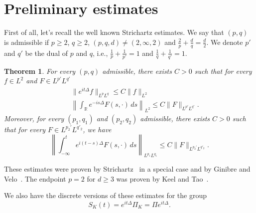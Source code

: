 \documentclass[10pt,a4paper]{article}
\newtheorem{theorem}{Theorem}[section]
\begin{document}
  \section{Preliminary estimates}\label{sec:pre-estim}

  First of all, let's recall the well known Strichartz estimates. We say that 
  \( (p,q) \) is admissible if \(p \geq 2\), \(q \geq 2\), \((p,q,d) \neq (2,\infty,2)\)
  and \( \frac2p + \frac{d}q = \frac{d}2 \). We denote \(p'\)
  and \(q'\) be the dual of \(p\) and \(q\), i.e., \(\frac1p+\frac1{p'} = 1\) 
  and \(\frac1q+\frac1{q'} = 1\). 

  \begin{theorem}
    For every \((p,q)\) admissible, there exists \(C > 0\) such that for every 
    \( f \in L^2 \) and \( F \in L^{p'} L^{q'} \)
    \begin{eqnarray}
      \label{Tc} & & \|e^{it \Delta} f \|_{L^p{L^q}} \leq C \| f\|_{L^2} \\
      \label{T*c} & & \left \| \int_{\mathbb R} e^{-is \Delta } F(s,\cdot)\, ds\right\|_{L^2} 
      \leq C \|F \|_{L^{p'} L^{q'}}.
    \end{eqnarray}
    Moreover, for every \((p_1, q_1)\) and \((p_2, q_2)\) admissible, there exists
    \(C > 0\) such that for every \(F \in L^{p_2'} L^{q'_2}\), we have
    \begin{equation}\label{TT*c} 
      \left\| \int_{-\infty}^t e^{i ( t-s ) \Delta } F(s,\cdot) \, ds \right\|_{L^{p_{1}} L^{q_{1}}}
      \leq  C \|F \|_{L^{p_{2}'} L^{q'_{2}}}.
    \end{equation}
  \end{theorem}

  These estimates were proven by Strichartz~\cite{Sz77} in a special case and by
  Ginibre and Velo~\cite{GiVl85}. The endpoint \(p=2\) for \(d \geq 3\) was proven by
  Keel and Tao~\cite{KeTa98}.

  We also have the discrete versions of these estimates for the group 
  \begin{equation}\label{SK}
    S_K(t) = e^{it\Delta} \Pi_K = \Pi e^{it\Delta}.
  \end{equation}
\end{document}
